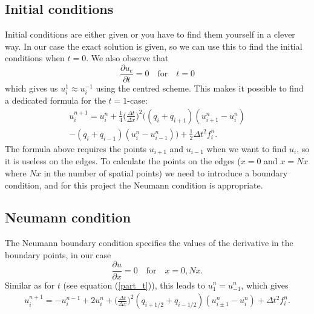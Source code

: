 \documentclass[norsk,a4paper,12pt]{article}
\begin{document}
\subsection{Initial conditions}
Initial conditions are either given or you have to find them yourself in a clever way. In our case the exact solution is given, so we can use this to find the initial conditions when $t=0$. We also observe that 
\begin{equation}
\frac{\partial u_e}{\partial t}=0\quad\text{for}\quad t=0
\label{part_t}
\end{equation}
which gives us $u_i^{1}\approx u_i^{-1}$ using the centred scheme. This makes it possible to find a dedicated formula for the $t=1$-case:
\begin{equation}
\begin{split}
u_i^{n+1}=u_i^n+\frac{1}{4}\bigg(\frac{\Delta t}{\Delta x}\bigg)^2\Big((q_i+q_{i+1})(u_{i+1}^n-u_i^n)\\
-(q_i+q_{i-1})(u_i^n-u_{i-1}^n)\Big)+\frac{1}{2}\Delta t^2f_i^n. 
\end{split}
\end{equation}
The formula above requires the points $u_{i+1}$ and $u_{i-1}$ when we want to find $u_i$, so it is useless on the edges. To calculate the points on the edges ($x=0$ and $x=Nx$ where $Nx$ in the number of spatial points) we need to introduce a boundary condition, and for this project the Neumann condition is appropriate.

\subsection{Neumann condition}
The Neumann boundary condition specifies the values of the derivative in the boundary points, in our case
\begin{equation*}
\frac{\partial u}{\partial x}=0 \quad\text{for}\quad x=0,Nx.
\end{equation*}
Similar as for $t$ (see equation (\ref{part_t})), this leads to $u_1^n=u_{-1}^n$, which gives
\begin{equation}
\begin{split}
u_i^{n+1}=-u_i^{n-1}+2u_i^n+\bigg(\frac{\Delta t}{\Delta x}\bigg)^2(q_{i+1/2}+q_{i-1/2})(u_{i\pm1}^n-u_i^n)
+\Delta t^2f_i^n.
\end{split}
\label{general}
\end{equation}
\end{document}
